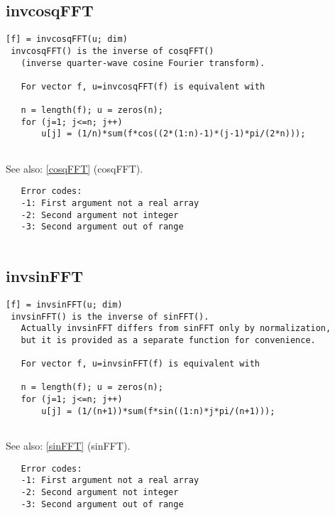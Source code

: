 \documentclass[a4paper]{article}
\begin{document}
\subsection{invcosqFFT\label{invcosqFFT}}

\begin{tscreen}
\begin{verbatim}
[f] = invcosqFFT(u; dim)
 invcosqFFT() is the inverse of cosqFFT()
   (inverse quarter-wave cosine Fourier transform).
   
   For vector f, u=invcosqFFT(f) is equivalent with

   n = length(f); u = zeros(n);
   for (j=1; j<=n; j++)
       u[j] = (1/n)*sum(f*cos((2*(1:n)-1)*(j-1)*pi/(2*n)));
   
\end{verbatim}

See also: \ref{cosqFFT} {(cosqFFT)}.
\begin{verbatim}
   Error codes:
   -1: First argument not a real array
   -2: Second argument not integer
   -3: Second argument out of range
   
\end{verbatim}
\end{tscreen}



\subsection{invsinFFT\label{invsinFFT}}

\begin{tscreen}
\begin{verbatim}
[f] = invsinFFT(u; dim)
 invsinFFT() is the inverse of sinFFT().
   Actually invsinFFT differs from sinFFT only by normalization,
   but it is provided as a separate function for convenience.
   
   For vector f, u=invsinFFT(f) is equivalent with

   n = length(f); u = zeros(n);
   for (j=1; j<=n; j++)
       u[j] = (1/(n+1))*sum(f*sin((1:n)*j*pi/(n+1)));
   
\end{verbatim}

See also: \ref{sinFFT} {(sinFFT)}.
\begin{verbatim}
   Error codes:
   -1: First argument not a real array
   -2: Second argument not integer
   -3: Second argument out of range
   
\end{verbatim}
\end{tscreen}
\end{document}
